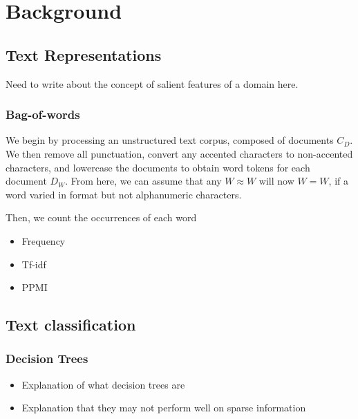 \chapter{Background}
\section{Text Representations}
Need to write about the concept of salient features of a domain here.
\subsection{Bag-of-words}\label{background:BOW}
We begin by processing an unstructured text corpus, composed of documents $C_D$. We then remove all punctuation, convert any accented characters to non-accented characters, and lowercase the documents to obtain word tokens for each document $D_W$. From here, we can assume that any $W \approx W$ will now $W = W$, if a word varied in format but not alphanumeric characters. 

Then, we count the occurrences of each word
\begin{itemize}
	\item Frequency
	\item Tf-idf
	\item PPMI \label{bg:ppmi}
\end{itemize}
\section{Text classification}
\subsection{Decision Trees}
\begin{itemize}
	\item Explanation of what decision trees are
	\item Explanation that they may not perform well on sparse information
\end{itemize}
